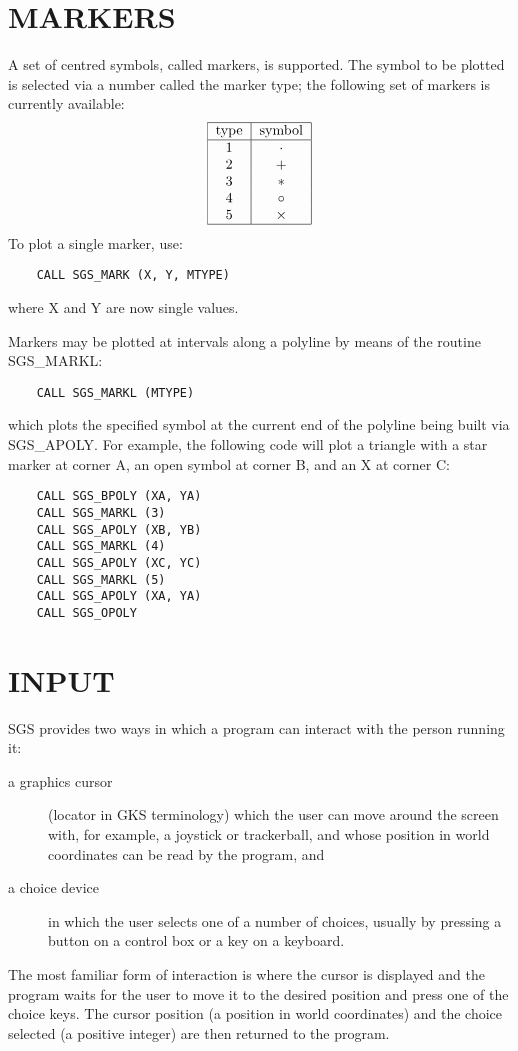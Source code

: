 \section {MARKERS}\label{sec-markers}

A set of centred symbols, called markers, is supported.  The
symbol to be plotted is selected via a number called the marker
type;  the following set of markers is currently available:
\[\tt\begin{tabular}{|c|c|}\hline
type&symbol\\\hline
1&$\cdot$\\
2&$+$\\
3&$\ast$\\
4&$\circ$\\
5&$\times$\\\hline
\end{tabular}\]
To plot a single marker,
use:
\begin{verbatim}
    CALL SGS_MARK (X, Y, MTYPE)
\end{verbatim}
where X and Y are now single values.

Markers may be plotted at intervals along a polyline by means of the
routine SGS\_MARKL:
\begin{verbatim}
    CALL SGS_MARKL (MTYPE)
\end{verbatim}
which plots the specified symbol at the current end of the polyline
being built via SGS\_APOLY.  For example, the following code will
plot a triangle with a star marker at corner A,
an open symbol at corner B, and an X at corner C:
\begin{verbatim}
    CALL SGS_BPOLY (XA, YA)
    CALL SGS_MARKL (3)
    CALL SGS_APOLY (XB, YB)
    CALL SGS_MARKL (4)
    CALL SGS_APOLY (XC, YC)
    CALL SGS_MARKL (5)
    CALL SGS_APOLY (XA, YA)
    CALL SGS_OPOLY
\end{verbatim}

\section {INPUT}

SGS provides two ways in which a program can interact with the person running
it:
\begin{description}
\item[a graphics cursor] (locator in GKS terminology) which
the user can move
around the screen with,
for example, a joystick or trackerball, and whose
position in world coordinates can be read by the program, and
\item[a choice device] in which the user
selects one of a number of choices, usually by pressing
a button on a control
box or a key on a keyboard.
\end{description}
The most familiar form of interaction is where the cursor is displayed and the 
program waits for the user to move it to the desired position and press one
of the choice keys.  The cursor position (a position in world coordinates) and
the choice selected (a positive integer) are then returned to the program.

